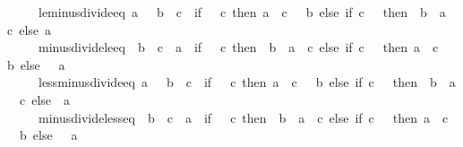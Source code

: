\begin{isabellebody}
\ \ \ \ \ le{\isacharunderscore}{\kern0pt}minus{\isacharunderscore}{\kern0pt}divide{\isacharunderscore}{\kern0pt}eq{\isacharcolon}{\kern0pt}\ {\isachardoublequoteopen}a\ {\isasymle}\ {\isacharminus}{\kern0pt}\ {\isacharparenleft}{\kern0pt}b\ {\isacharslash}{\kern0pt}\ c{\isacharparenright}{\kern0pt}\ {\isasymlongleftrightarrow}\ {\isacharparenleft}{\kern0pt}if\ {}\ {\isacharless}{\kern0pt}\ c\ then\ a\ {\isacharasterisk}{\kern0pt}\ c\ {\isasymle}\ {\isacharminus}{\kern0pt}\ b\ else\ if\ c\ {\isacharless}{\kern0pt}\ {}\ then\ {\isacharminus}{\kern0pt}\ b\ {\isasymle}\ a\ {\isacharasterisk}{\kern0pt}\ c\ else\ a\ {\isasymle}\ {}{\isacharparenright}{\kern0pt}{\isachardoublequoteclose}\isanewline
\ \ \ \ \ minus{\isacharunderscore}{\kern0pt}divide{\isacharunderscore}{\kern0pt}le{\isacharunderscore}{\kern0pt}eq{\isacharcolon}{\kern0pt}\ {\isachardoublequoteopen}{\isacharminus}{\kern0pt}\ {\isacharparenleft}{\kern0pt}b\ {\isacharslash}{\kern0pt}\ c{\isacharparenright}{\kern0pt}\ {\isasymle}\ a\ {\isasymlongleftrightarrow}\ {\isacharparenleft}{\kern0pt}if\ {}\ {\isacharless}{\kern0pt}\ c\ then\ {\isacharminus}{\kern0pt}\ b\ {\isasymle}\ a\ {\isacharasterisk}{\kern0pt}\ c\ else\ if\ c\ {\isacharless}{\kern0pt}\ {}\ then\ a\ {\isacharasterisk}{\kern0pt}\ c\ {\isasymle}\ {\isacharminus}{\kern0pt}\ b\ else\ {}\ {\isasymle}\ a{\isacharparenright}{\kern0pt}{\isachardoublequoteclose}\isanewline
\ \ \ \ \ less{\isacharunderscore}{\kern0pt}minus{\isacharunderscore}{\kern0pt}divide{\isacharunderscore}{\kern0pt}eq{\isacharcolon}{\kern0pt}\ {\isachardoublequoteopen}a\ {\isacharless}{\kern0pt}\ {\isacharminus}{\kern0pt}\ {\isacharparenleft}{\kern0pt}b\ {\isacharslash}{\kern0pt}\ c{\isacharparenright}{\kern0pt}\ {\isasymlongleftrightarrow}\ {\isacharparenleft}{\kern0pt}if\ {}\ {\isacharless}{\kern0pt}\ c\ then\ a\ {\isacharasterisk}{\kern0pt}\ c\ {\isacharless}{\kern0pt}\ {\isacharminus}{\kern0pt}\ b\ else\ if\ c\ {\isacharless}{\kern0pt}\ {}\ then\ {\isacharminus}{\kern0pt}\ b\ {\isacharless}{\kern0pt}\ a\ {\isacharasterisk}{\kern0pt}\ c\ else\ \ a\ {\isacharless}{\kern0pt}\ {}{\isacharparenright}{\kern0pt}{\isachardoublequoteclose}\isanewline
\ \ \ \ \ minus{\isacharunderscore}{\kern0pt}divide{\isacharunderscore}{\kern0pt}less{\isacharunderscore}{\kern0pt}eq{\isacharcolon}{\kern0pt}\ {\isachardoublequoteopen}{\isacharminus}{\kern0pt}\ {\isacharparenleft}{\kern0pt}b\ {\isacharslash}{\kern0pt}\ c{\isacharparenright}{\kern0pt}\ {\isacharless}{\kern0pt}\ a\ {\isasymlongleftrightarrow}\ {\isacharparenleft}{\kern0pt}if\ {}\ {\isacharless}{\kern0pt}\ c\ then\ {\isacharminus}{\kern0pt}\ b\ {\isacharless}{\kern0pt}\ a\ {\isacharasterisk}{\kern0pt}\ c\ else\ if\ c\ {\isacharless}{\kern0pt}\ {}\ then\ a\ {\isacharasterisk}{\kern0pt}\ c\ {\isacharless}{\kern0pt}\ {\isacharminus}{\kern0pt}\ b\ else\ {}\ {\isacharless}{\kern0pt}\ a{\isacharparenright}{\kern0pt}{\isachardoublequoteclose}\isanewline

\end{isabellebody}
